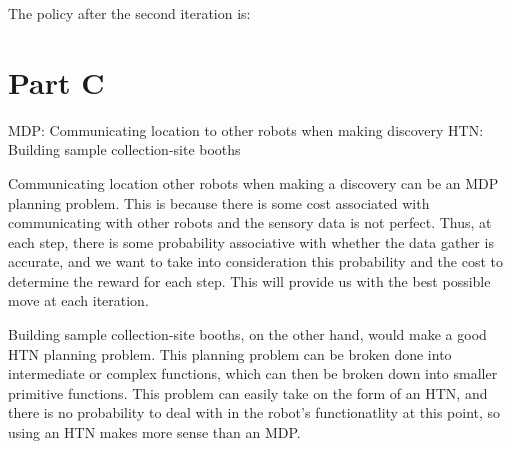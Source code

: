 \documentclass[12pt]{article}
\begin{document}
The policy after the second iteration is:





\section{Part C}
MDP: Communicating location to other robots when making discovery
HTN: Building sample collection-site booths

Communicating location other robots when making a discovery can be an MDP planning problem. This is because there is some cost associated with communicating with other robots and the sensory data is not perfect. Thus, at each step, there is some probability associative with whether the data gather is accurate, and we want to take into consideration this probability and the cost to determine the reward for each step. This will provide us with the best possible move at each iteration.

Building sample collection-site booths, on the other hand, would make a good HTN planning problem. This planning problem can be broken done into intermediate or complex functions, which can then be broken down into smaller primitive functions. This problem can easily take on the form of an HTN, and there is no probability to deal with in the robot's functionatlity at this point, so using an HTN makes more sense than an MDP.
\end{document}
